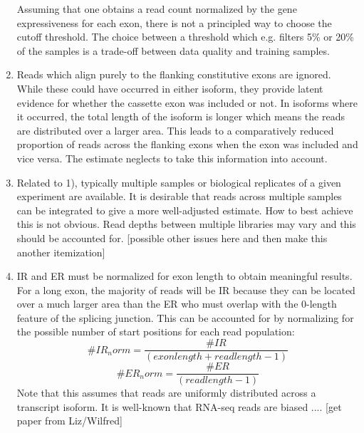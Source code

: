 \begin{enumerate}
	Assuming that one obtains a read count normalized by the gene expressiveness for each exon, there is not a principled way to choose the cutoff threshold. The choice between a threshold which e.g. filters 5\% or 20\% of the samples is a trade-off between data quality and training samples.
	\item Reads which align purely to the flanking constitutive exons are ignored. While these could have occurred in either isoform, they provide latent evidence for whether the cassette exon was included or not. In isoforms where it occurred, the total length of the isoform is longer which means the reads are distributed over a larger area. This leads to a comparatively reduced proportion of reads across the flanking exons when the exon was included and vice versa. The estimate neglects to take this information into account.
	\item Related to 1), typically multiple samples or biological replicates of a given experiment are available. It is desirable that reads across multiple samples can be integrated to give a more well-adjusted estimate. How to best achieve this is not obvious. Read depths between multiple libraries may vary and this should be accounted for. [possible other issues here and then make this another itemization]
	\item IR and ER must be normalized for exon length to obtain meaningful results. For a long exon, the majority of reads will be IR because they can be located over a much larger area than the ER who must overlap with the 0-length feature of the splicing junction. This can be accounted for by normalizing for the possible number of start positions for each read population:
	$$\#IR_norm = \frac{\#IR}{(exon length + read length -1)}$$
	$$\#ER_norm = \frac{\#ER}{(read length - 1)}$$
	Note that this assumes that reads are uniformly distributed across a transcript isoform. It is well-known that RNA-seq reads are biased .... [get paper from Liz/Wilfred]
	
\end{enumerate}



